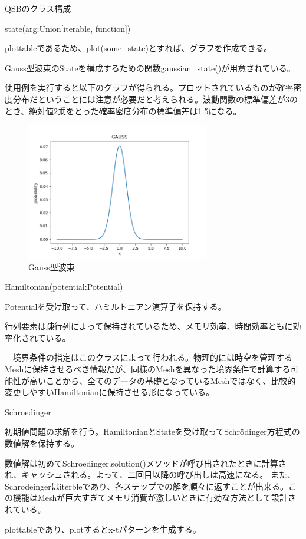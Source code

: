 \documentclass[a4paper, lualatex]{bxjsarticle}
\begin{document}
\begin{section}{QSBのクラス構成}
\begin{subsection}{state(arg:Union[iterable, function])}
        \par plottableであるため、plot(some\_state)とすれば、グラフを作成できる。
        \par Gauss型波束のStateを構成するための関数gaussian\_state()が用意されている。
        
         使用例を実行すると以下のグラフが得られる。プロットされているものが確率密度分布だということには注意が必要だと考えられる。波動関数の標準偏差が3のとき、絶対値2乗をとった確率密度分布の標準偏差は1.5になる。
         \begin{figure}[h]
            \centering
            \includegraphics[width=8cm]{GAUSS.png}
            \caption{Gauss型波束}
        \end{figure}
    \end{subsection}
    \begin{subsection}{Hamiltonian(potential:Potential)}
        \par Potentialを受け取って、ハミルトニアン演算子を保持する。
        \par 行列要素は疎行列によって保持されているため、メモリ効率、時間効率ともに効率化されている。
        \par　境界条件の指定はこのクラスによって行われる。物理的には時空を管理するMeshに保持させるべき情報だが、同様のMeshを異なった境界条件で計算する可能性が高いことから、全てのデータの基礎となっているMeshではなく、比較的変更しやすいHamiltonianに保持させる形になっている。
    \end{subsection}
    \begin{subsection}{Schroedinger}
        \par 初期値問題の求解を行う。HamiltonianとStateを受け取ってSchrödinger方程式の数値解を保持する。
        \par 数値解は初めてSchroedinger.solution()メソッドが呼び出されたときに計算され、キャッシュされる。よって、二回目以降の呼び出しは高速になる。 また、Schrodeingerはiterbleであり、各ステップでの解を順々に返すことが出来る。この機能はMeshが巨大すぎてメモリ消費が激しいときに有効な方法として設計されている。
        \par plottableであり、plotするとx-tパターンを生成する。
    \end{subsection}
\end{section}
\end{document}

